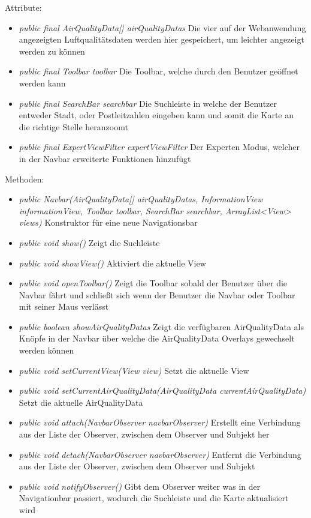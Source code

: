 Attribute:
\begin{itemize}
    \item \emph{public final AirQualityData[] airQualityDatas} Die vier auf der Webanwendung angezeigten Luftqualitätsdaten werden hier gespeichert, um leichter angezeigt werden zu können
    \item \emph{public final Toolbar toolbar} Die Toolbar, welche durch den Benutzer geöffnet werden kann
    \item \emph{public final SearchBar searchbar} Die Suchleiste in welche der Benutzer entweder Stadt, oder Postleitzahlen eingeben kann und somit die Karte an die richtige Stelle heranzoomt
    \item \emph{public final ExpertViewFilter expertViewFilter} Der Experten Modus, welcher in der Navbar erweiterte Funktionen hinzufügt

\end{itemize}
Methoden:
\begin{itemize}
    \item \emph{public Navbar(AirQualityData[] airQualityDatas, InformationView informationView, Toolbar toolbar, SearchBar searchbar, ArrayList<View> views)} Konstruktor für eine neue Navigationsbar
    \item \emph{public void show()} Zeigt die Suchleiste
    \item \emph{public void showView()} Aktiviert die aktuelle View
    \item \emph{public void openToolbar()} Zeigt die Toolbar sobald der Benutzer über die Navbar fährt und schließt sich wenn der Benutzer die Navbar oder Toolbar mit seiner Maus verlässt
    \item \emph{public boolean showAirQualityDatas} Zeigt die verfügbaren AirQualityData als Knöpfe in der Navbar über welche die AirQualityData Overlays gewechselt werden können
    \item \emph{public void setCurrentView(View view)} Setzt die aktuelle View
    \item \emph{public void setCurrentAirQualityData(AirQualityData currentAirQualityData)} Setzt die aktuelle AirQualityData
    \item \emph{public void attach(NavbarObserver navbarObserver)} Erstellt eine Verbindung aus der Liste der Observer, zwischen dem Observer und Subjekt her
    \item \emph{public void detach(NavbarObserver navbarObserver)} Entfernt die Verbindung aus der Liste der Observer, zwischen dem Observer und Subjekt
    \item \emph{public void notifyObserver()} Gibt dem Observer weiter was in der Navigationbar passiert, wodurch die Suchleiste und die Karte aktualisiert wird
\end{itemize}

